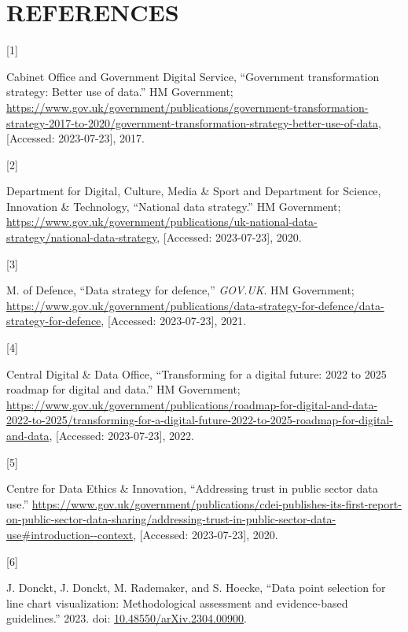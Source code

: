 \documentclass{article}
\newlength{\cslhangindent}
\newlength{\csllabelwidth}
\newlength{\cslentryspacingunit} %
\newenvironment{CSLReferences}[2] %
 {%
  \setlength{\parindent}{0pt}
  \ifodd #1
  \let\oldpar\par
  \def\par{\hangindent=\cslhangindent\oldpar}
  \fi
  \setlength{\parskip}{#2\cslentryspacingunit}
 }%
 {}
\newcommand{\CSLLeftMargin}[1]{\parbox[t]{\csllabelwidth}{#1}}
\newcommand{\CSLRightInline}[1]{\parbox[t]{\linewidth - \csllabelwidth}{#1}\break}
\begin{document}
\newpage

\hypertarget{references}{%
\section*{REFERENCES}\label{references}}

\hypertarget{refs}{}
\begin{CSLReferences}{0}{0}
\leavevmode{}%
\CSLLeftMargin{{[}1{]} }
\CSLRightInline{Cabinet Office and Government Digital Service,
{``Government transformation strategy: Better use of data.''} HM
Government;
\url{https://www.gov.uk/government/publications/government-transformation-strategy-2017-to-2020/government-transformation-strategy-better-use-of-data},
{[}Accessed: 2023-07-23{]}, 2017.}

\leavevmode{}%
\CSLLeftMargin{{[}2{]} }
\CSLRightInline{Department for Digital, Culture, Media \& Sport and
Department for Science, Innovation \& Technology, {``National data
strategy.''} HM Government;
\url{https://www.gov.uk/government/publications/uk-national-data-strategy/national-data-strategy},
{[}Accessed: 2023-07-23{]}, 2020.}

\leavevmode{}%
\CSLLeftMargin{{[}3{]} }
\CSLRightInline{M. of Defence, {``Data strategy for defence,''}
\emph{GOV.UK}. HM Government;
\url{https://www.gov.uk/government/publications/data-strategy-for-defence/data-strategy-for-defence},
{[}Accessed: 2023-07-23{]}, 2021.}

\leavevmode{}%
\CSLLeftMargin{{[}4{]} }
\CSLRightInline{Central Digital \& Data Office, {``Transforming for a
digital future: 2022 to 2025 roadmap for digital and data.''} HM
Government;
\url{https://www.gov.uk/government/publications/roadmap-for-digital-and-data-2022-to-2025/transforming-for-a-digital-future-2022-to-2025-roadmap-for-digital-and-data},
{[}Accessed: 2023-07-23{]}, 2022.}

\leavevmode{}%
\CSLLeftMargin{{[}5{]} }
\CSLRightInline{Centre for Data Ethics \& Innovation, {``Addressing
trust in public sector data use.''}
\url{https://www.gov.uk/government/publications/cdei-publishes-its-first-report-on-public-sector-data-sharing/addressing-trust-in-public-sector-data-use\#introduction--context},
{[}Accessed: 2023-07-23{]}, 2020.}

\leavevmode{}%
\CSLLeftMargin{{[}6{]} }
\CSLRightInline{J. Donckt, J. Donckt, M. Rademaker, and S. Hoecke,
{``Data point selection for line chart visualization: Methodological
assessment and evidence-based guidelines.''} 2023. doi:
\href{https://doi.org/10.48550/arXiv.2304.00900}{10.48550/arXiv.2304.00900}.}


\end{CSLReferences}
\end{document}

